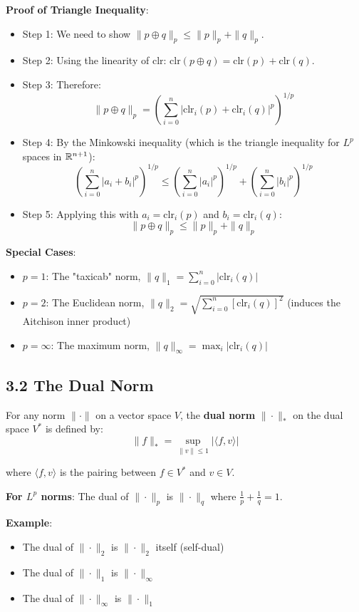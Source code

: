 \documentclass{amsart}
\let\originalmathbb\mathbb
\renewcommand{\mathbb}[1]{%
    \ifstrequal{#1}{1}{\mathbbm{#1}}{\originalmathbb{#1}}%
}
\theoremstyle{plain}
\theoremstyle{definition}
\theoremstyle{remark}
\begin{document}
\textbf{Proof of Triangle Inequality}:

\begin{itemize}
	\item Step 1: We need to show $\|p \oplus q\|_p \leq \|p\|_p + \|q\|_p$.
	\item Step 2: Using the linearity of clr: $\text{clr}(p \oplus q) = \text{clr}(p) + \text{clr}(q)$.
	\item Step 3: Therefore:
\[
\|p \oplus q\|_p = \left(\sum_{i=0}^n |\text{clr}_i(p) + \text{clr}_i(q)|^p\right)^{1/p}
\]
	\item Step 4: By the Minkowski inequality (which is the triangle inequality for $L^p$ spaces in $\mathbb{R}^{n+1}$):
\[
\left(\sum_{i=0}^n |a_i + b_i|^p\right)^{1/p} \leq \left(\sum_{i=0}^n |a_i|^p\right)^{1/p} + \left(\sum_{i=0}^n |b_i|^p\right)^{1/p}
\]
	\item Step 5: Applying this with $a_i = \text{clr}_i(p)$ and $b_i = \text{clr}_i(q)$:
\[
\|p \oplus q\|_p \leq \|p\|_p + \|q\|_p
\]
\end{itemize}

\textbf{Special Cases}:

\begin{itemize}
	\item $p = 1$: The "taxicab" norm, $\|q\|_1 = \sum_{i=0}^n |\text{clr}_i(q)|$
	\item $p = 2$: The Euclidean norm, $\|q\|_2 = \sqrt{\sum_{i=0}^n [\text{clr}_i(q)]^2}$ (induces the Aitchison inner product)
	\item $p = \infty$: The maximum norm, $\|q\|_\infty = \max_i |\text{clr}_i(q)|$
\end{itemize}

\subsection{3.2 The Dual Norm}

For any norm $\|\cdot\|$ on a vector space $V$, the \textbf{dual norm} $\|\cdot\|_*$ on the dual space $V^*$ is defined by:
\[
\|f\|_* = \sup_{\|v\| \leq 1} |\langle f, v \rangle|
\]

where $\langle f, v \rangle$ is the pairing between $f \in V^*$ and $v \in V$.

\textbf{For $L^p$ norms}: The dual of $\|\cdot\|_p$ is $\|\cdot\|_q$ where $\frac{1}{p} + \frac{1}{q} = 1$.

\textbf{Example}:

\begin{itemize}
	\item The dual of $\|\cdot\|_2$ is $\|\cdot\|_2$ itself (self-dual)
	\item The dual of $\|\cdot\|_1$ is $\|\cdot\|_\infty$
	\item The dual of $\|\cdot\|_\infty$ is $\|\cdot\|_1$
\end{itemize}
\end{document}
